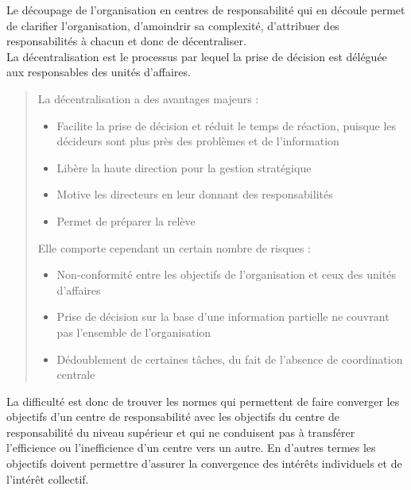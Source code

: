 \documentclass{kaobook}
\begin{document}
Le découpage de l’organisation en centres de responsabilité qui en découle permet de clarifier l’organisation, d’amoindrir sa complexité, d’attribuer des responsabilités à chacun et donc de décentraliser.\\
La décentralisation est le processus par lequel la prise de décision est déléguée aux responsables des unités d'affaires.\\
\begin{quote}
La décentralisation a des avantages majeurs :\\
\begin{itemize}
\item Facilite la prise de décision et réduit le temps de réaction, puisque les décideurs sont plus près des problèmes et de l’information\\
\item Libère la haute direction pour la gestion stratégique\\
\item Motive les directeurs en leur donnant des responsabilités\\
\item Permet de préparer la relève\\
\end{itemize}
Elle comporte cependant un certain nombre de risques :\\
\begin{itemize}
\item Non-conformité entre les objectifs de l’organisation et ceux des unités d’affaires\\
\item Prise de décision sur la base d’une information partielle ne couvrant pas l'ensemble de l'organisation\\
\item Dédoublement de certaines tâches, du fait de l'absence de coordination centrale\\
\end{itemize}
\end{quote}
La difficulté est donc de trouver les normes qui permettent de faire converger les objectifs d’un centre de responsabilité avec les objectifs du centre de responsabilité du niveau supérieur et qui ne conduisent pas à transférer l’efficience ou l’inefficience d’un centre vers un autre. En d’autres termes les objectifs doivent permettre d’assurer la convergence des intérêts individuels et de l’intérêt collectif.\\
\end{document}
